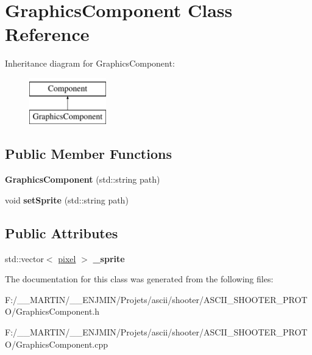 \hypertarget{class_graphics_component}{}\section{Graphics\+Component Class Reference}
\label{class_graphics_component}
Inheritance diagram for Graphics\+Component\+:\begin{figure}[H]
\begin{center}
\leavevmode
\includegraphics[height=2.000000cm]{class_graphics_component}
\end{center}
\end{figure}
\subsection*{Public Member Functions}
\begin{DoxyCompactItemize}
\item 
\hypertarget{class_graphics_component_af9c775bcb7f51c76c25d32b3152cd5b2}{}\label{class_graphics_component_af9c775bcb7f51c76c25d32b3152cd5b2} 
{\bfseries Graphics\+Component} (std\+::string path)
\item 
\hypertarget{class_graphics_component_ab3e309ee0a8dcbc1b927d38bf2e1d8c9}{}\label{class_graphics_component_ab3e309ee0a8dcbc1b927d38bf2e1d8c9} 
void {\bfseries set\+Sprite} (std\+::string path)
\end{DoxyCompactItemize}
\subsection*{Public Attributes}
\begin{DoxyCompactItemize}
\item 
\hypertarget{class_graphics_component_ab16775099a92f1442b2b2a1f41da997e}{}\label{class_graphics_component_ab16775099a92f1442b2b2a1f41da997e} 
std\+::vector$<$ \hyperlink{structpixel}{pixel} $>$ {\bfseries \+\_\+sprite}
\end{DoxyCompactItemize}


The documentation for this class was generated from the following files\+:\begin{DoxyCompactItemize}
\item 
F\+:/\+\_\+\+\_\+\+M\+A\+R\+T\+I\+N/\+\_\+\+\_\+\+E\+N\+J\+M\+I\+N/\+Projets/ascii/shooter/\+A\+S\+C\+I\+I\+\_\+\+S\+H\+O\+O\+T\+E\+R\+\_\+\+P\+R\+O\+T\+O/Graphics\+Component.\+h\item 
F\+:/\+\_\+\+\_\+\+M\+A\+R\+T\+I\+N/\+\_\+\+\_\+\+E\+N\+J\+M\+I\+N/\+Projets/ascii/shooter/\+A\+S\+C\+I\+I\+\_\+\+S\+H\+O\+O\+T\+E\+R\+\_\+\+P\+R\+O\+T\+O/Graphics\+Component.\+cpp\end{DoxyCompactItemize}
